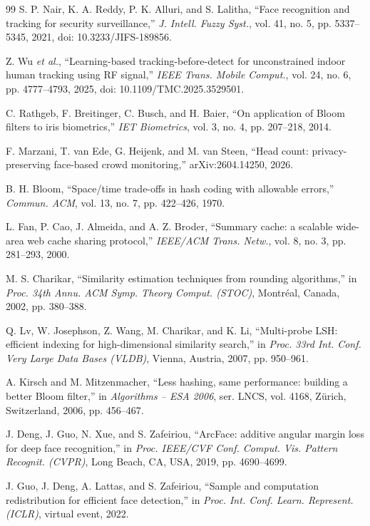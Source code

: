 \documentclass[12pt,a4paper,oneside]{report}
\begin{document}
\begin{thebibliography}{99}
S. P. Nair, K. A. Reddy, P. K. Alluri, and S. Lalitha,
``Face recognition and tracking for security surveillance,''
\textit{J. Intell. Fuzzy Syst.},
vol. 41, no. 5, pp. 5337--5345,
2021, doi: 10.3233/JIFS-189856.

Z. Wu \textit{et al.},
``Learning-based tracking-before-detect for unconstrained indoor human tracking using RF signal,''
\textit{IEEE Trans. Mobile Comput.},
vol. 24, no. 6, pp. 4777--4793,
2025, doi: 10.1109/TMC.2025.3529501.

C. Rathgeb, F. Breitinger, C. Busch, and H. Baier,
``On application of Bloom filters to iris biometrics,''
\textit{IET Biometrics},
vol. 3, no. 4, pp. 207--218,
2014.

F. Marzani, T. van Ede, G. Heijenk, and M. van Steen,
``Head count: privacy-preserving face-based crowd monitoring,''
arXiv:2604.14250, 2026.

B. H. Bloom,
``Space/time trade-offs in hash coding with allowable errors,''
\textit{Commun. ACM},
vol. 13, no. 7, pp. 422--426,
1970.

L. Fan, P. Cao, J. Almeida, and A. Z. Broder,
``Summary cache: a scalable wide-area web cache sharing protocol,''
\textit{IEEE/ACM Trans. Netw.},
vol. 8, no. 3, pp. 281--293,
2000.

M. S. Charikar,
``Similarity estimation techniques from rounding algorithms,''
in \textit{Proc. 34th Annu. ACM Symp. Theory Comput. (STOC)},
Montr\'eal, Canada, 2002, pp. 380--388.

Q. Lv, W. Josephson, Z. Wang, M. Charikar, and K. Li,
``Multi-probe LSH: efficient indexing for high-dimensional similarity search,''
in \textit{Proc. 33rd Int. Conf. Very Large Data Bases (VLDB)},
Vienna, Austria, 2007, pp. 950--961.

A. Kirsch and M. Mitzenmacher,
``Less hashing, same performance: building a better Bloom filter,''
in \textit{Algorithms -- ESA 2006}, ser. LNCS, vol. 4168,
Z\"urich, Switzerland, 2006, pp. 456--467.

J. Deng, J. Guo, N. Xue, and S. Zafeiriou,
``ArcFace: additive angular margin loss for deep face recognition,''
in \textit{Proc. IEEE/CVF Conf. Comput. Vis. Pattern Recognit. (CVPR)},
Long Beach, CA, USA, 2019, pp. 4690--4699.

J. Guo, J. Deng, A. Lattas, and S. Zafeiriou,
``Sample and computation redistribution for efficient face detection,''
in \textit{Proc. Int. Conf. Learn. Represent. (ICLR)},
virtual event, 2022.


\end{thebibliography}
\end{document}
